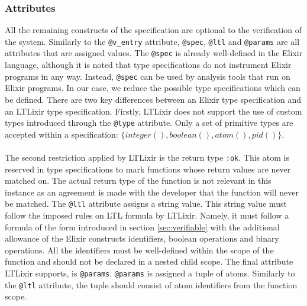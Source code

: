 \subsubsection{Attributes}
All the remaining constructs of the specification are optional to the verification of the system. Similarly to the \texttt{@v\_entry} attribute, \texttt{@spec}, \texttt{@ltl} and \texttt{@params} are all attributes that are assigned values. The \texttt{@spec} is already well-defined in the Elixir language, although it is noted that type specifications do not instrument Elixir programs in any way. Instead, \texttt{@spec} can be used by analysis tools that run on Elixir programs. In our case, we reduce the possible type specifications which can be defined. There are two key differences between an Elixir type specification and an LTLixir type specification. Firstly, LTLixir does not support the use of custom types introduced through the \texttt{@type} attribute. Only a set of primitive types are accepted within a specification: $\{integer(), boolean(), atom(), pid()\}$.
\\ \\
The second restriction applied by LTLixir is the return type \texttt{:ok}. This atom is reserved in type specifications to mark functions whose return values are never matched on. The actual return type of the function is not relevant in this instance as an agreement is made with the developer that the function will never be matched. The \texttt{@ltl} attribute assigns a string value. This string value must follow the imposed rules on LTL formula by LTLixir. Namely, it must follow a formula of the form introduced in section \ref{sec:verifiable} with the additional allowance of the Elixir constructs identifiers, boolean operations and binary operations. All the identifiers must be well-defined within the scope of the function and should not be declared in a nested child scope. The final attribute LTLixir supports, is \texttt{@params}. \texttt{@params} is assigned a tuple of atoms. Similarly to the \texttt{@ltl} attribute, the tuple should consist of atom identifiers from the function scope.
\\ \\
